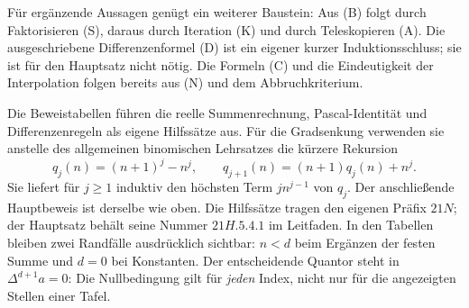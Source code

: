 Für ergänzende Aussagen genügt ein weiterer Baustein: Aus (B) folgt
durch Faktorisieren (S), daraus durch Iteration (K) und durch
Teleskopieren (A). Die ausgeschriebene Differenzenformel (D) ist ein
eigener kurzer Induktionsschluss; sie ist für den Hauptsatz nicht nötig.
Die Formeln (C) und die Eindeutigkeit der Interpolation folgen bereits
aus (N) und dem Abbruchkriterium.

Die Beweistabellen führen die reelle Summenrechnung, Pascal-Identität
und Differenzenregeln als eigene Hilfssätze aus. Für die Gradsenkung
verwenden sie anstelle des allgemeinen binomischen Lehrsatzes die
kürzere Rekursion
\[
 q_j(n)=(n+1)^j-n^j,\qquad
 q_{j+1}(n)=(n+1)q_j(n)+n^j.
\]
Sie liefert für $j\geq1$ induktiv den höchsten Term $j n^{j-1}$ von $q_j$.
Der anschließende Hauptbeweis ist derselbe wie oben. Die Hilfssätze
tragen den eigenen Präfix $21N$; der Hauptsatz behält seine Nummer
$21H.5.4.1$ im Leitfaden.
In den Tabellen bleiben zwei Randfälle ausdrücklich sichtbar: $n<d$ beim Ergänzen der festen Summe und $d=0$ bei Konstanten.
Der entscheidende Quantor steht in $\Delta^{d+1}a=0$:
Die Nullbedingung gilt für \emph{jeden} Index, nicht nur für die
angezeigten Stellen einer Tafel.
